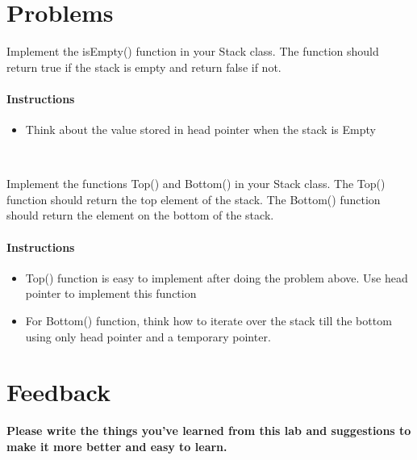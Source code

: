 \documentclass[11pt,fleqn]{book} %
\begin{document}
 \section{Problems}
 \begin{problem}
 	Implement the isEmpty() function in your Stack class. The function should return true if the stack is empty and return false if not.
 	\paragraph{Instructions}
 	\begin{itemize}
 		\item Think about the value stored in head pointer when the stack is Empty
 	\end{itemize}
 \end{problem}
~\\
\begin{problem}
	Implement the  functions Top() and Bottom() in your Stack class. The Top() function should return the top element of the stack. The Bottom() function should return the element on the bottom of the stack.
	\paragraph{Instructions}
		\begin{itemize}
			\item Top() function is easy to implement after doing the problem above. Use head pointer to implement this function
			\item For Bottom() function, think how to iterate over the stack till the bottom using only head pointer and a temporary pointer.
		\end{itemize}
\end{problem}
\newpage


\section{Feedback}
\textbf{Please write the things you've learned from this lab and suggestions to make it more better and easy to learn.}

\end{document}
